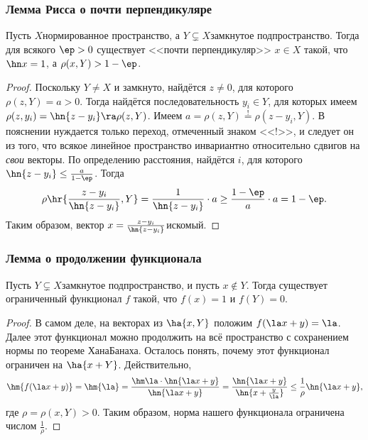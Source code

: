 \documentclass[a4paper]{article}
\begin{document}
\subsubsection{Лемма Рисса о почти перпендикуляре}

\begin{lemma}
Пусть $X$\т нормированное пространство, а $Y \subsetneq X$\т замкнутое подпространство.
Тогда для всякого $\ep > 0$ существует <<почти перпендикуляр>> $x \in X$ такой,
что $\hn x = 1$, а $\rho(x,Y) > 1-\ep$.
\end{lemma}
\begin{proof}
Поскольку $Y \neq X$ и замкнуто, найдётся $z \neq 0$, для которого $\rho(z, Y) = a > 0$.
Тогда найдётся последовательность $y_i \in Y$, для которых имеем $\rho(z,y_i) = \hn{z-y_i} \ra \rho(z,Y)$.
Имеем $a = \rho(z,Y) \stackrel{!}{=} \rho(z-y_i, Y)$. В пояснении нуждается только переход,
отмеченный знаком <<!>>, и следует он из того, что всякое линейное пространство инвариантно относительно
сдвигов на \emph{свои} векторы. По определению расстояния, найдётся $i$, для которого $\hn{z - y_i} \le \frac{a}{1-\ep}$.
Тогда
$$\rho\hr{\frac{z-y_i}{\hn{z-y_i}}, Y} = \frac{1}{\hn{z-y_i}}\cdot a \ge \frac{1-\ep}{a}\cdot a = 1-\ep.$$
Таким образом, вектор $x = \frac{z-y_i}{\hn{z-y_i}}$\т искомый.
\end{proof}


\subsubsection{Лемма о продолжении функционала}

\begin{lemma}\label{lem:func.extension}
Пусть $Y \subsetneq  X$\т замкнутое подпространство, и пусть $x \notin Y$. Тогда существует
ограниченный функционал $f$ такой, что $f(x) = 1$ и $f(Y) = 0$.
\end{lemma}
\begin{proof}
В самом деле, на векторах из $\ha{x, Y}$ положим $f(\la x + y) = \la$. Далее этот функционал можно продолжить
на всё пространство с сохранением нормы по теореме Хана\ч Банаха. Осталось понять, почему этот функционал
ограничен на $\ha{x + Y}$. Действительно,
$$\hm{f(\la x + y)} = \hm{\la} = \frac{\hm\la \cdot \hn{\la x + y}}{\hn{\la x + y}} =
\frac{\hn{\la x + y}}{\hn{x + \frac{y}{\la}}} \le \frac{1}{\rho}\hn{\la x + y},$$
где $\rho = \rho(x, Y) > 0$. Таким образом, норма нашего функционала ограничена числом $\frac1\rho$.
\end{proof}
\end{document}
